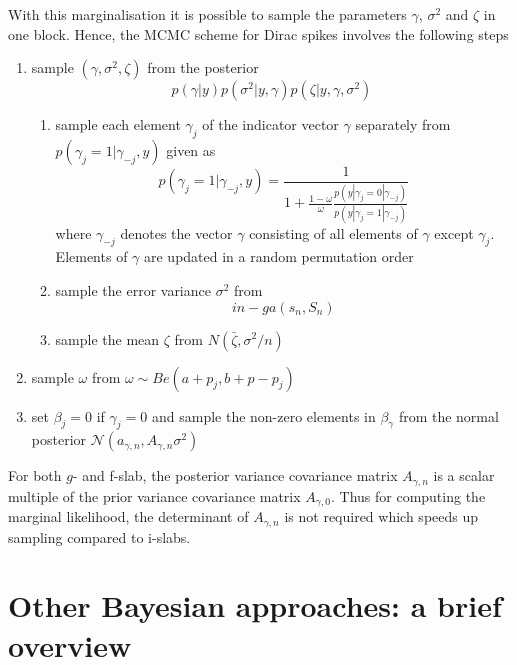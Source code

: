 \documentclass[11 pt]{article}
\begin{document}
\begin{multicols}{2}
With this marginalisation it is possible to sample the parameters $\gamma$, $\sigma^2$ and $\zeta$ in one block. Hence, the MCMC scheme for Dirac spikes involves the following steps
\begin{enumerate}
    \item sample $(\gamma, \sigma^2, \zeta)$ from the posterior $$p(\gamma|y)p(\sigma^2|y, \gamma)p(\zeta|y, \gamma, \sigma^2)$$
    \begin{enumerate}
        \item sample each element $\gamma_j$ of the indicator vector $\gamma$ separately from $p(\gamma_j = 1|\gamma_{-j}, y)$ given as $$p(\gamma_j = 1|\gamma_{-j}, y) = \frac{1}{1+\frac{1-\omega}{\omega}\frac{p(y|\gamma_j=0|\gamma_{-j})}{p(y|\gamma_j=1|\gamma_{-j})}}$$
        where $\gamma_{-j}$ denotes the vector $\gamma$ consisting of all elements of $\gamma$ except $\gamma_j$. Elements of $\gamma$ are updated in a random permutation order
        \item sample the error variance $\sigma^2$ from $$in-ga(s_n, S_n)$$
        \item sample the mean $\zeta$ from $N(\bar{\zeta}, \sigma^2/n)$
    \end{enumerate}
    \item sample $\omega$ from $\omega \sim Be(a + p_j, b + p - p_j)$
    \item set $\beta_j = 0$ if $\gamma_j = 0$ and sample the non-zero elements in $\beta_\gamma$ from the normal posterior $\mathcal{N}(a_{\gamma,n},A_{\gamma,n}\sigma^2)$
\end{enumerate}
For both $g$- and f-slab, the posterior variance covariance matrix $A_{\gamma,n}$ is a scalar multiple of the prior variance covariance matrix $A_{\gamma,0}$. Thus for computing the marginal likelihood, the determinant of $A_{\gamma,n}$ is not required which speeds up sampling compared to i-slabs.


\section{Other Bayesian approaches: a brief overview}



\end{multicols}
\end{document}
